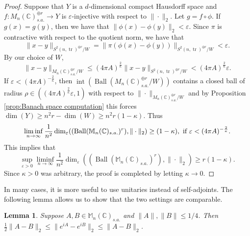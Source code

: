 \documentclass[10pt]{amsart}
\newtheorem{lem}[thm]{Lemma}
\theoremstyle{definition}
\numberwithin{equation}{section}
\newcommand{\bC}{{\mathbb C}}
\newcommand{\bM}{{\mathbb M}}
\DeclareMathOperator{\tr}{tr}
\DeclareMathOperator{\Int}{int}
\DeclareMathOperator{\Ball}{Ball}
\begin{document}
\begin{proof}
Suppose that $Y$ is a $d$-dimensional compact Hausdorff space and $f\colon M_{n}(\bC)_{s.a.}^{\oplus r}\to Y$ is $\varepsilon$-injective with respect to $\|\cdot\|_{2}$. Let $g=f\circ \phi$. If $g(x)=g(y)$, then we have that $\|\phi(x)-\phi(y)\|_{2}<\varepsilon.$ Since $\pi$ is contractive with respect to the quotient norm, we have that 
\[\|x-y\|_{S^{2}(n,\tr)^{\oplus r}/W}=\|\pi(\phi(x)-\phi(y))\|_{S^{2}(n,\tr)^{\oplus r}/W}<\varepsilon.\]
By our choice of $W$,
\[\|x-y\|_{M_{n}(\bC)_{s.a.}^{\oplus r}/W}\leq \left(4\pi A\right)^{\frac{2}{\kappa}}\|x-y\|_{S^{2}(n,\tr)^{\oplus r}/W}<\left(4\pi A\right)^{\frac{2}{\kappa}}\varepsilon.\]
If $\varepsilon<(4\pi A)^{-\frac{2}{\kappa}}$, then $\Int(\Ball(M_{n}(\bC)_{s.a.}^{\oplus r}/W))$  contains a closed ball of radius $\rho\in \left(\left(4\pi A\right)^{\frac{2}{\kappa}}\varepsilon,1\right)$ with respect to $\|\cdot\|_{M_{n}(\bC)_{s.a.}^{\oplus r}/W}$ and by Proposition \ref{prop:Banach space computation} this forces $\dim(Y)\geq n^{2}r-\dim(W)\geq n^{2}r(1-\kappa)$. Thus 
\[\liminf_{n\to\infty}\frac{1}{n^{2}}\dim_{\varepsilon}((\Ball(\bM_{n}(\bC)_{s.a.})^{r}),\|\cdot\|_{2})\geq (1-\kappa), \textnormal{ if $\varepsilon<(4\pi A)^{-\frac{2}{\kappa}}$.}\]
This implies that 
\[\sup_{\varepsilon>0}\liminf_{n\to\infty}\frac{1}{n^{2}}\dim_{\varepsilon}((\Ball(\bM_{n}(\bC)_{s.a.})^{r}),\|\cdot\|_{2})\geq r(1-\kappa).\]
Since $\kappa>0$ was arbitrary, the proof is completed by letting $\kappa\to 0$.










\end{proof}


In many cases, it is more useful to use unitaries instead of self-adjoints. The following lemma allows us to show that the two settings are comparable.

\begin{lem}\label{lem: coercive unitary}
Suppose $A,B\in \bM_{n}(\bC)_{s.a.}$ and $\|A\|,\|B\|\leq 1/4$. Then $\frac{1}{2}\|A-B\|_{2}\leq \|e^{iA}-e^{iB}\|_{2}\leq \|A-B\|_{2}$. 

\end{lem}
\end{document}
